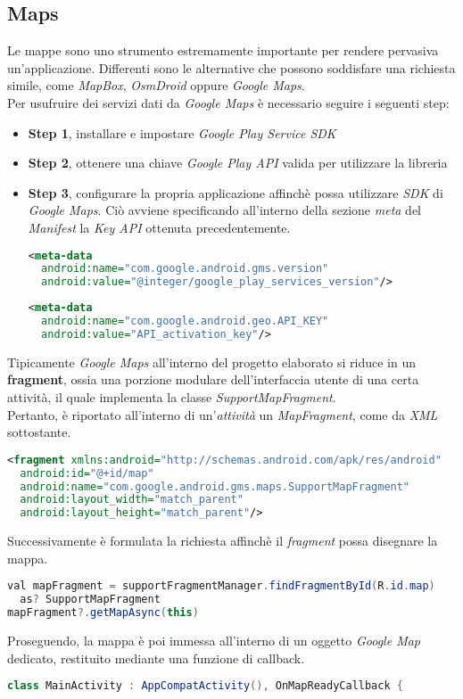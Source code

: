 \documentclass{article}
\begin{document}
\subsection*{Maps}
Le mappe sono uno strumento estremamente importante per rendere pervasiva un'applicazione. Differenti sono le alternative che possono soddisfare una richiesta simile, come \textit{MapBox}, \textit{OsmDroid} oppure \textit{Google Maps}.\vspace*{7pt}\\
Per usufruire dei servizi dati da \textit{Google Maps} è necessario seguire i seguenti step:
\begin{itemize}[label={-}]
  \itemsep0em
  \item \textbf{Step 1}, installare e impostare \textit{Google Play Service SDK}
  \item \textbf{Step 2}, ottenere una chiave \textit{Google Play API} valida per utilizzare la libreria
  \item \textbf{Step 3}, configurare la propria applicazione affinchè possa utilizzare \textit{SDK} di \textit{Google Maps}. Ciò avviene specificando all'interno della sezione \textit{meta} del \textit{Manifest} la \textit{Key API} ottenuta precedentemente. 
  \begin{lstlisting}[language=XML]
<meta-data
  android:name="com.google.android.gms.version"
  android:value="@integer/google_play_services_version"/>
  \end{lstlisting}
  \begin{lstlisting}[language=XML]
<meta-data
  android:name="com.google.android.geo.API_KEY"
  android:value="API_activation_key"/>
  \end{lstlisting}
\end{itemize}
Tipicamente \textit{Google Maps} all'interno del progetto elaborato si riduce in un \textbf{fragment}, ossia una porzione modulare dell'interfaccia utente di una certa attività, il quale implementa la classe \textit{SupportMapFragment}.\vspace*{7pt}\\
Pertanto, è riportato all'interno di un'\textit{attività} un \textit{MapFragment}, come da \textit{XML} sottostante.
\begin{lstlisting}[language=XML]
<fragment xmlns:android="http://schemas.android.com/apk/res/android"
  android:id="@+id/map"
  android:name="com.google.android.gms.maps.SupportMapFragment"
  android:layout_width="match_parent"
  android:layout_height="match_parent"/>
\end{lstlisting}
Successivamente è formulata la richiesta affinchè il \textit{fragment} possa disegnare la mappa.
\begin{lstlisting}[language=JAVA]
val mapFragment = supportFragmentManager.findFragmentById(R.id.map)
  as? SupportMapFragment
mapFragment?.getMapAsync(this)
\end{lstlisting}
Proseguendo, la mappa è poi immessa all'interno di un oggetto \textit{Google Map} dedicato, restituito mediante una funzione di callback.
\begin{lstlisting}[language=JAVA]
class MainActivity : AppCompatActivity(), OnMapReadyCallback {
\end{lstlisting}
\end{document}
